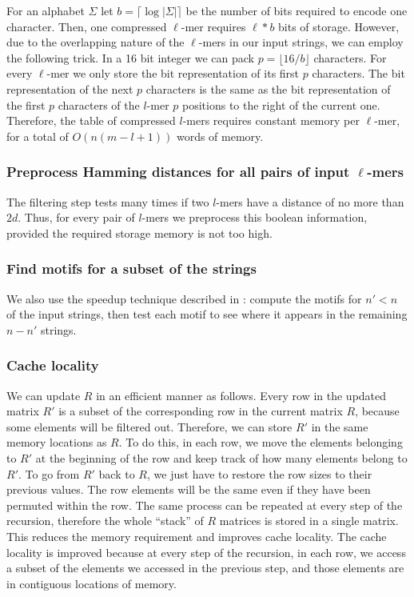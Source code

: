 For an alphabet $\Sigma$ let $b=\lceil \log|\Sigma| \rceil$ be the number of
bits required to encode one character. Then, one compressed $\ell$-mer
requires $\ell * b$ bits of storage. However, due to
the overlapping nature of the $\ell$-mers in our input strings, we can employ
the following trick. In a 16 bit integer we can pack $p=\lfloor 16/b \rfloor$
characters. For every $\ell$-mer we only store the bit representation of its
first $p$ characters. The bit representation of the next $p$ characters is the
same as the bit representation of the first $p$ characters of the $l$-mer $p$ 
positions to the right of the current one. Therefore, the table of compressed
$l$-mers requires constant memory per $\ell$-mer, for a total of $O(n(m-l+1))$
words of memory.

\subsubsection{Preprocess Hamming distances for all pairs of input $\ell$-mers}
\label{secDistPairs}
The filtering step tests many times if two $l$-mers have a
distance of no more than $2d$. Thus, for every pair
of $l$-mers we preprocess this boolean information, provided the
required storage memory is not too high.

\subsubsection{Find motifs for a subset of the strings}
\label{secSubsetMotifs}
We also use the speedup technique described in \cite{RD11}: compute the motifs
for $n' < n$ of the input strings, then test each motif to see where it appears
in the remaining $n-n'$ strings. 

\subsubsection{Cache locality}
We can update $R$ in an efficient manner as follows. Every row in the
updated matrix $R'$ is a subset of the corresponding row in the current matrix
$R$, because some elements will be filtered out. Therefore, we can store $R'$
in the same memory locations as $R$. To do this, in each row, we move the elements belonging
to $R'$ at the beginning of the row and keep track of how many elements
belong to $R'$. To go from $R'$ back to $R$, we just have to restore the row
sizes to their previous values. The row elements will be the same even if they have
been permuted within the row. The same process can be repeated at every
step of the recursion, therefore the whole ``stack'' of $R$ matrices is stored in a
single matrix. This reduces the memory requirement and improves cache locality.
The cache locality is improved because at every step of the
recursion, in each row, we access a subset of the elements we accessed in the previous step, and
those elements are in contiguous locations of memory.


